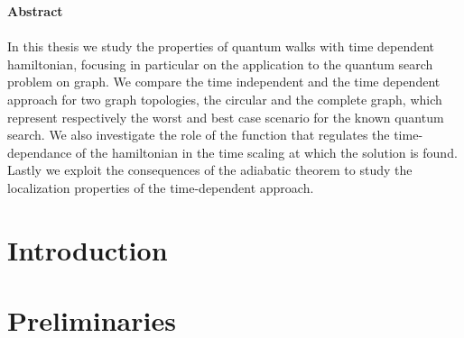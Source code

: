 \documentclass[11pt, twoside]{report}
\begin{document}
\newpage
\thispagestyle{empty}
\textbf{\Large{Abstract}} \\ \\
\noindent
In this thesis we study the properties of quantum walks with time dependent hamiltonian, focusing in particular on the application to the quantum search problem on graph. We compare the time independent and the time dependent approach for two graph topologies, the circular and the complete graph, which represent respectively the worst and best case scenario for the known quantum search. We also investigate the role of the function that regulates the time-dependance of the hamiltonian in the time scaling at which the solution is found. Lastly we exploit the consequences of the adiabatic theorem to study the localization properties of the time-dependent approach.

\newpage
\thispagestyle{empty}
\doublespacing
\tableofcontents
\onehalfspacing

\newpage
\thispagestyle{empty}
\listoffigures


\newpage
\chapter*{Introduction}


\newpage
\thispagestyle{empty}
\chapter{Preliminaries}
\end{document}
